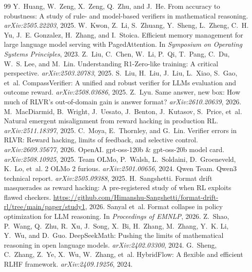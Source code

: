 \documentclass[10pt]{article}
\begin{document}
\begin{thebibliography}{99}
 Y.~Huang, W.~Zeng, X.~Zeng, Q.~Zhu, and J.~He. From accuracy to robustness: A study of rule- and model-based verifiers in mathematical reasoning. \emph{arXiv:2505.22203}, 2025.
 W.~Kwon, Z.~Li, S.~Zhuang, Y.~Sheng, L.~Zheng, C.~H. Yu, J.~E. Gonzalez, H.~Zhang, and I.~Stoica. Efficient memory management for large language model serving with {PagedAttention}. In \emph{Symposium on Operating Systems Principles}, 2023.
 Z.~Liu, C.~Chen, W.~Li, P.~Qi, T.~Pang, C.~Du, W.~S. Lee, and M.~Lin. Understanding {R1-Zero}-like training: A critical perspective. \emph{arXiv:2503.20783}, 2025.
 S.~Liu, H.~Liu, J.~Liu, L.~Xiao, S.~Gao, et~al. {CompassVerifier}: A unified and robust verifier for {LLMs} evaluation and outcome reward. \emph{arXiv:2508.03686}, 2025.
 Z.~Lyu. Same answer, new box: How much of {RLVR}'s out-of-domain gain is answer format? \emph{arXiv:2610.20639}, 2026.
 M.~MacDiarmid, B.~Wright, J.~Uesato, J.~Benton, J.~Kutasov, S.~Price, et~al. Natural emergent misalignment from reward hacking in production {RL}. \emph{arXiv:2511.18397}, 2025.
 C.~Moya, E.~Thornley, and G.~Lin. Verifier errors in {RLVR}: Reward hacking, limits of feedback, and selective control. \emph{arXiv:2609.35677}, 2026.
 OpenAI. gpt-oss-120b \& gpt-oss-20b model card. \emph{arXiv:2508.10925}, 2025.
 Team OLMo, P.~Walsh, L.~Soldaini, D.~Groeneveld, K.~Lo, et~al. 2 {OLMo} 2 furious. \emph{arXiv:2501.00656}, 2024.
 Qwen Team. Qwen3 technical report. \emph{arXiv:2505.09388}, 2025.
 H.~Sangshetti. Format drift masquerades as reward hacking: A pre-registered study of when {RL} exploits flawed checkers. \url{https://github.com/Himanshu-Sangshetti/format-drift-rl/tree/main/paper/study1}, 2026.
 Sanyal et~al. Format collapse in policy optimization for {LLM} reasoning. In \emph{Proceedings of EMNLP}, 2026.
 Z.~Shao, P.~Wang, Q.~Zhu, R.~Xu, J.~Song, X.~Bi, H.~Zhang, M.~Zhang, Y.~K. Li, Y.~Wu, and D.~Guo. {DeepSeekMath}: Pushing the limits of mathematical reasoning in open language models. \emph{arXiv:2402.03300}, 2024.
 G.~Sheng, C.~Zhang, Z.~Ye, X.~Wu, W.~Zhang, et~al. {HybridFlow}: A flexible and efficient {RLHF} framework. \emph{arXiv:2409.19256}, 2024.

\end{thebibliography}
\end{document}
